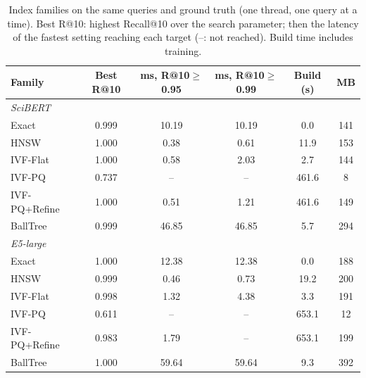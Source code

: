 \begin{table}[tbp]
\caption{Index families on the same queries and ground truth (one thread, one query at a time). Best R@10: highest Recall@10 over the search parameter; then the latency of the fastest setting reaching each target (--: not reached). Build time includes training.}\label{tab:familias}
\centering
\small
\begin{tabular}{|l|c|c|c|c|c|}
\hline
\textbf{Family} & \textbf{Best R@10} & \textbf{ms, R@10$\geq$0.95} & \textbf{ms, R@10$\geq$0.99} & \textbf{Build (s)} & \textbf{MB} \\
\hline
\multicolumn{6}{|l|}{\textit{SciBERT}} \\
Exact & 0.999 & 10.19 & 10.19 & 0.0 & 141 \\
HNSW & 1.000 & 0.38 & 0.61 & 11.9 & 153 \\
IVF-Flat & 1.000 & 0.58 & 2.03 & 2.7 & 144 \\
IVF-PQ & 0.737 & -- & -- & 461.6 & 8 \\
IVF-PQ+Refine & 1.000 & 0.51 & 1.21 & 461.6 & 149 \\
BallTree & 0.999 & 46.85 & 46.85 & 5.7 & 294 \\
\multicolumn{6}{|l|}{\textit{E5-large}} \\
Exact & 1.000 & 12.38 & 12.38 & 0.0 & 188 \\
HNSW & 0.999 & 0.46 & 0.73 & 19.2 & 200 \\
IVF-Flat & 0.998 & 1.32 & 4.38 & 3.3 & 191 \\
IVF-PQ & 0.611 & -- & -- & 653.1 & 12 \\
IVF-PQ+Refine & 0.983 & 1.79 & -- & 653.1 & 199 \\
BallTree & 1.000 & 59.64 & 59.64 & 9.3 & 392 \\
\hline
\end{tabular}
\end{table}